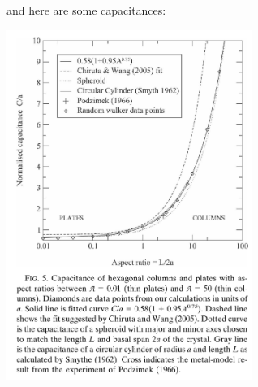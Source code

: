 \documentclass[12pt]{article}
\begin{document}
and here are some capacitances:

\includegraphics[width=0.6\textwidth]{capacitance.png}
\end{document}
